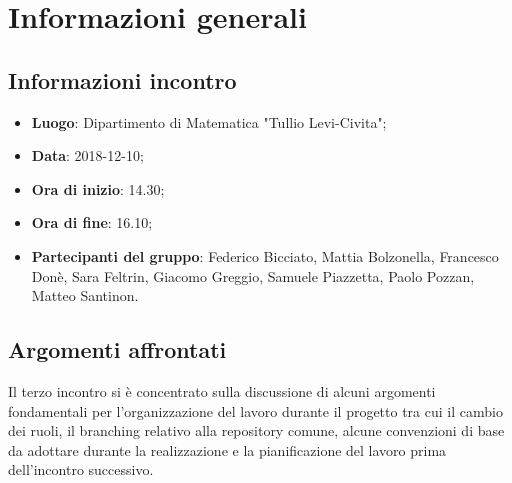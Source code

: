 \section{Informazioni generali}

\subsection{Informazioni incontro}
\begin{itemize}
\item \textbf{Luogo}: Dipartimento di Matematica "Tullio Levi-Civita";
\item \textbf{Data}: 2018-12-10;
\item \textbf{Ora di inizio}: 14.30;
\item \textbf{Ora di fine}: 16.10;
\item \textbf{Partecipanti del gruppo}: Federico Bicciato, Mattia Bolzonella, 
Francesco Donè, Sara Feltrin, Giacomo Greggio, Samuele Piazzetta, Paolo Pozzan, 
Matteo Santinon. 
\end{itemize}

\subsection{Argomenti affrontati}
Il terzo incontro si è concentrato sulla discussione di alcuni argomenti fondamentali per l'organizzazione del lavoro durante il progetto tra cui il cambio dei ruoli, il branching relativo alla repository comune, alcune convenzioni di base da adottare durante la realizzazione e la pianificazione del lavoro prima dell'incontro successivo.
